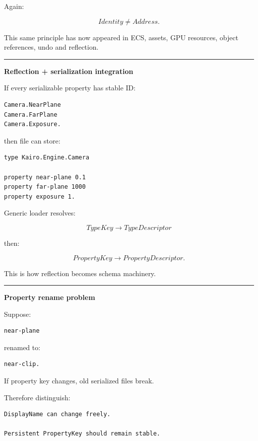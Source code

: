 Again:

\[
\boxed{
Identity
\neq
Address.
}
\]

This same principle has now appeared in ECS, assets, GPU resources, object references, undo and reflection.

\begin{center}\rule{0.5\linewidth}{0.5pt}\end{center}

\textbf{Reflection + serialization integration}

If every serializable property has stable ID:

\begin{verbatim}
Camera.NearPlane
Camera.FarPlane
Camera.Exposure.
\end{verbatim}

then file can store:

\begin{verbatim}
type Kairo.Engine.Camera

property near-plane 0.1
property far-plane 1000
property exposure 1.
\end{verbatim}

Generic loader resolves:

\[
TypeKey
\rightarrow
TypeDescriptor
\]

then:

\[
PropertyKey
\rightarrow
PropertyDescriptor.
\]

This is how reflection becomes schema machinery.

\begin{center}\rule{0.5\linewidth}{0.5pt}\end{center}

\textbf{Property rename problem}

Suppose:

\begin{verbatim}
near-plane
\end{verbatim}

renamed to:

\begin{verbatim}
near-clip.
\end{verbatim}

If property key changes, old serialized files break.

Therefore distinguish:

\begin{verbatim}
DisplayName can change freely.

Persistent PropertyKey should remain stable.
\end{verbatim}

